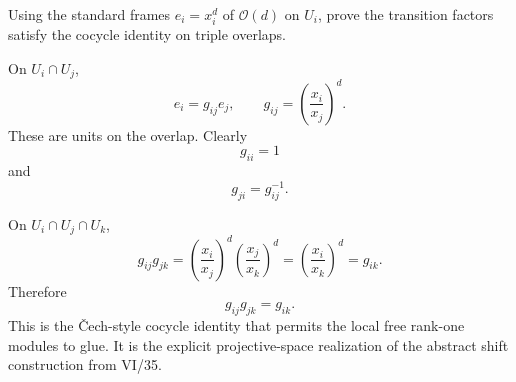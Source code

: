 \begin{problem}\label{prob:vi36-17}
Using the standard frames \(e_i=x_i^d\) of \(\mathcal O(d)\) on \(U_i\), prove the transition factors satisfy the cocycle
identity on triple overlaps.

\end{problem}

\ifdefined\FullProblemDossiers
\begin{solution}
On \(U_i\cap U_j\),
\[
e_i
=
g_{ij}e_j,
\qquad
g_{ij}
=
\left(\frac{x_i}{x_j}\right)^d.
\]
These are units on the overlap. Clearly
\[
g_{ii}=1
\]
and
\[
g_{ji}=g_{ij}^{-1}.
\]

On \(U_i\cap U_j\cap U_k\),
\[
g_{ij}g_{jk}
=
\left(\frac{x_i}{x_j}\right)^d
\left(\frac{x_j}{x_k}\right)^d
=
\left(\frac{x_i}{x_k}\right)^d
=
g_{ik}.
\]
Therefore
\[
\boxed{
g_{ij}g_{jk}=g_{ik}.
}
\]
This is the Čech-style cocycle identity that permits the local free rank-one modules to glue. It is the explicit
projective-space realization of the abstract shift construction from VI/35.
\end{solution}
\fi
